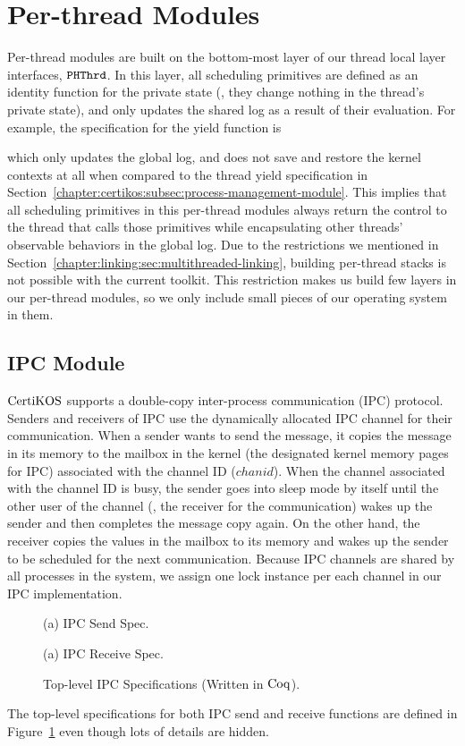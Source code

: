 \section{Per-thread Modules}
\label{chapter:certikos:sec:per-thread-modules}

Per-thread modules are built on
the bottom-most layer of our thread local layer interfaces, ${{\mathrm{\texttt{PHThrd}}}}$.
In this layer, all scheduling primitives are defined as an identity function for the private state (\ie, they change nothing in the thread's private state),
and only updates the shared log as a result of their evaluation. 
For example, the specification for the  yield function is

which only updates the global log, and does not save and restore the kernel contexts at all when compared to the thread yield specification 
in Section~\ref{chapter:certikos:subsec:process-management-module}.
This implies that all scheduling primitives in this per-thread modules always return the control to the thread  that calls those primitives while
encapsulating other threads' observable behaviors in the global log.
Due to the restrictions  we mentioned in Section~\ref{chapter:linking:sec:multithreaded-linking},
building per-thread stacks is not possible with the current toolkit. 
This restriction makes us build few layers in our per-thread modules,
so we only include small pieces of our operating system in them.


\subsection{IPC Module}
\label{chapter:certikos:subsec:ipc-module}

$\mathrm{CertiKOS}$ supports a double-copy inter-process communication (IPC) protocol.
Senders and receivers of IPC use the dynamically allocated IPC channel for their communication. 
When a sender wants to send the message, 
it copies the  message in its memory to the mailbox in the kernel (the designated kernel memory pages for IPC) associated with the channel ID ($chanid$).
When the channel associated with the channel ID is busy, the sender goes into  sleep mode by itself until the other user of the channel
(\ie, the receiver for the communication) wakes up the sender and then completes the message copy again. 
On the other hand, the receiver copies the values in the mailbox to its memory and wakes up the sender to be scheduled for the next communication. 
Because IPC channels are shared by all processes in the system, 
we assign one lock instance per each channel in our IPC implementation.
 \begin{figure}
\begin{center}

(a) IPC Send Spec.
 
(a) IPC Receive Spec.
\end{center}
\caption{Top-level IPC Specifications (Written in $\mathrm{Coq}$).}
\label{fig:chapter:certikos:ipc-specs}
\end{figure}
The top-level specifications for both IPC send and receive functions are defined in Figure~\ref{fig:chapter:certikos:ipc-specs}
even though lots of details are hidden. 


